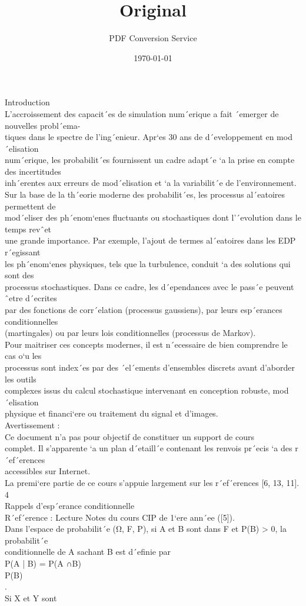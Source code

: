 \documentclass{article}
\title{Original}
\author{PDF Conversion Service}
\date{\today}
\begin{document}
\maketitle
Introduction \\ L'accroissement des capacit´es de simulation num´erique a fait ´emerger de nouvelles probl´ema- \\ tiques dans le spectre de l'ing´enieur. Apr`es 30 ans de d´eveloppement en mod´elisation \\ num´erique, les probabilit´es fournissent un cadre adapt´e `a la prise en compte des incertitudes \\ inh´erentes aux erreurs de mod´elisation et `a la variabilit´e de l'environnement. \\ Sur la base de la th´eorie moderne des probabilit´es, les processus al´eatoires permettent de \\ mod´eliser des ph´enom`enes ﬂuctuants ou stochastiques dont l'´evolution dans le temps revˆet \\ une grande importance. Par exemple, l'ajout de termes al´eatoires dans les EDP r´egissant \\ les ph´enom`enes physiques, tels que la turbulence, conduit `a des solutions qui sont des \\ processus stochastiques. Dans ce cadre, les d´ependances avec le pass´e peuvent ˆetre d´ecrites \\ par des fonctions de corr´elation (processus gaussiens), par leurs esp´erances conditionnelles \\ (martingales) ou par leurs lois conditionnelles (processus de Markov). \\ Pour maitriser ces concepts modernes, il est n´ecessaire de bien comprendre le cas o`u les \\ processus sont index´es par des ´el´ements d'ensembles discrets avant d'aborder les outils \\ complexes issus du calcul stochastique intervenant en conception robuste, mod´elisation \\ physique et ﬁnanci`ere ou traitement du signal et d'images. \\ Avertissement : \\ Ce document n'a pas pour objectif de constituer un support de cours \\ complet. Il s'apparente `a un plan d´etaill´e contenant les renvois pr´ecis `a des r´ef´erences \\ accessibles sur Internet. \\ La premi`ere partie de ce cours s'appuie largement sur les r´ef´erences [6, 13, 11]. \\ 4 \\ Rappels d'esp´erance conditionnelle \\ R´ef´erence : Lecture Notes du cours CIP de 1`ere ann´ee ([5]). \\ Dans l'espace de probabilit´e (Ω, F, P), si A et B sont dans F et P(B) > 0, la probabilit´e \\ conditionnelle de A sachant B est d´eﬁnie par \\ P(A | B) = P(A ∩B) \\ P(B) \\ . \\ Si X et Y sont 
\end{document}
